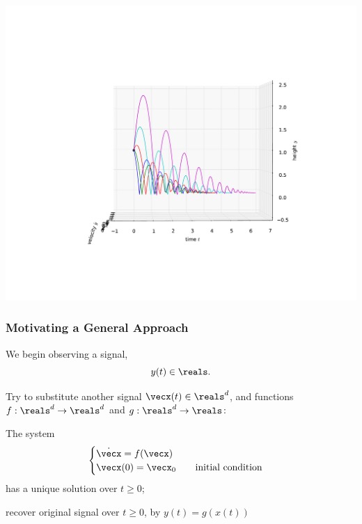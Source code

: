 \documentclass[12pt]{beamer}
\begin{document}
\begin{frame}
\vfill\centering
\includegraphics[width=.9\linewidth]{pic/bouncing_ball_reflattened}
\vfill\null
\end{frame}




\begin{frame}
\frametitle{Motivating a General Approach}

\begin{itemize}

\vitem We begin observing a signal,
\[
y(t) \in \reals.
\]



\vitem Try to substitute another signal $\vecx(t) \in \reals^d$, and
functions $f : \reals^d \to \reals^d$ and $g : \reals^d \to \reals$:

\begin{enumerate}
\vitem The system
\[
\begin{cases}
	\dot \vecx = f(\vecx) \\
	\vecx(0) = \vecx_0 \qquad \text{initial condition}
\end{cases}
\]
has a unique solution over $t \geq 0$;

\vitem recover original signal over $t \geq 0$, by $y(t) = g( x(t) )$ 


\end{enumerate}

\end{itemize}

\vfill\null
\end{frame}
\end{document}
